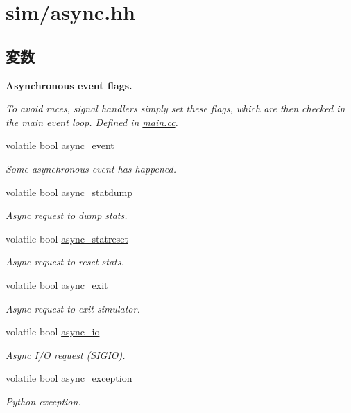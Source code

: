 \hypertarget{async_8hh}{
\section{sim/async.hh}
\label{async_8hh}
}
\subsection*{変数}
\begin{Indent}{\bf Asynchronous event flags.}\par
{\em \label{_amgrp135efe99de16e9c0a8627ce514f94cf7}
 To avoid races, signal handlers simply set these flags, which are then checked in the main event loop. Defined in \hyperlink{main_8cc}{main.cc}. }\begin{DoxyCompactItemize}
\item 
volatile bool \hyperlink{async_8hh_a57c3b44f29e475ec6335a9e50d41e475}{async\_\-event}
\begin{DoxyCompactList}\small\item\em Some asynchronous event has happened. \item\end{DoxyCompactList}\item 
volatile bool \hyperlink{async_8hh_aefaca48e0adec29337fb2900291759ea}{async\_\-statdump}
\begin{DoxyCompactList}\small\item\em Async request to dump stats. \item\end{DoxyCompactList}\item 
volatile bool \hyperlink{async_8hh_af604aa1dbffb0b9ac7a175595de2dc90}{async\_\-statreset}
\begin{DoxyCompactList}\small\item\em Async request to reset stats. \item\end{DoxyCompactList}\item 
volatile bool \hyperlink{async_8hh_ae5b6da2b5697b92c26bd768281b4b1f3}{async\_\-exit}
\begin{DoxyCompactList}\small\item\em Async request to exit simulator. \item\end{DoxyCompactList}\item 
volatile bool \hyperlink{async_8hh_a24b042c9473a660dca598c7da33413b6}{async\_\-io}
\begin{DoxyCompactList}\small\item\em Async I/O request (SIGIO). \item\end{DoxyCompactList}\item 
volatile bool \hyperlink{async_8hh_a59ce3c841db7ca8545a8942128e3019a}{async\_\-exception}
\begin{DoxyCompactList}\small\item\em Python exception. \item\end{DoxyCompactList}\end{DoxyCompactItemize}
\end{Indent}


